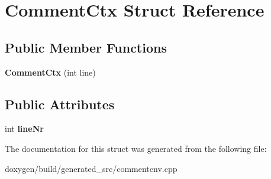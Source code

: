 \hypertarget{struct_comment_ctx}{}\section{Comment\+Ctx Struct Reference}
\label{struct_comment_ctx}
\subsection*{Public Member Functions}
\begin{DoxyCompactItemize}
\item 
\mbox{\label{struct_comment_ctx_a6fafdb4c8671ecd020f5d5aba7091388}} 
{\bfseries Comment\+Ctx} (int line)
\end{DoxyCompactItemize}
\subsection*{Public Attributes}
\begin{DoxyCompactItemize}
\item 
\mbox{\label{struct_comment_ctx_aa806b54f9e0d1c31a51106ef2fa4389f}} 
int {\bfseries line\+Nr}
\end{DoxyCompactItemize}


The documentation for this struct was generated from the following file\+:\begin{DoxyCompactItemize}
\item 
doxygen/build/generated\+\_\+src/commentcnv.\+cpp\end{DoxyCompactItemize}

